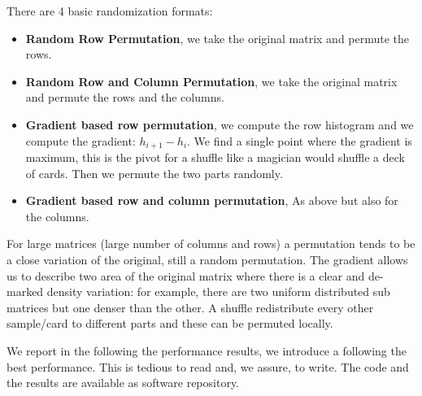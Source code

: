 \documentclass[manuscript,screen]{acmart}
\begin{document}
There are 4 basic randomization formats:
\begin{itemize}
  \item {\bf Random Row Permutation}, we take the original matrix and
    permute the rows.
  \item {\bf Random Row and Column Permutation}, we take the original
    matrix and permute the rows and the columns.
  \item {\bf Gradient based row permutation}, we compute the row
    histogram and we compute the gradient: $h_{i+1} - h_i$. We find a
    single point where the gradient is maximum, this is the pivot for
    a shuffle like a magician would shuffle a deck of cards.  Then we
    permute the two parts randomly.
  \item {\bf Gradient based row and column permutation}, As above but
    also for the columns.
\end{itemize}

For large matrices (large number of columns and rows) a permutation
tends to be a close variation of the original, still a random
permutation. The gradient allows us to describe two area of the
original matrix where there is a clear and de-marked density
variation: for example, there are two uniform distributed sub matrices
but one denser than the other. A shuffle redistribute every other
sample/card to different parts and these can be permuted locally.


    
We report in the following the performance results, we introduce a
{\bf *} following the best performance. This is tedious to read and,
we assure, to write. The code and the results are available as
software repository.  




%

 

%
\end{document}
